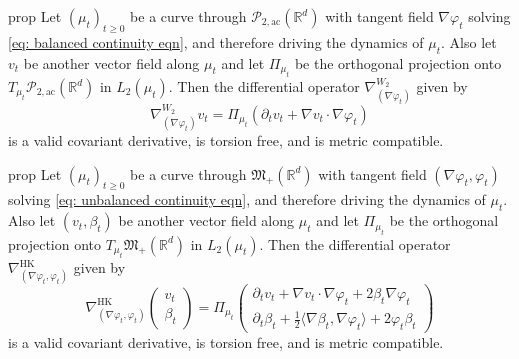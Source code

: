 \documentclass{article}
\newcommand{\pac}{\mathcal{P}_{2, \text{ac}}(\mathbb{R}^d)}
\newcommand{\posm}{\mathfrak{M}_+(\mathbb{R}^d)}
\begin{document}
\begin{restatable}{prop}{} \label{Wasserstein covariant deriv}
    Let $(\mu_t)_{t\geq 0}$ be a curve through $\pac$ with tangent field $\nabla \varphi_t$ solving \cref{eq: balanced continuity eqn}, and therefore driving the dynamics of $\mu_t$. Also let $v_t$ be another vector field along $\mu_t$ and let $\Pi_{\mu_t}$ be the orthogonal projection onto $T_{\mu_t}\pac$ in $L_2(\mu_t)$. Then the differential operator $\nabla_{(\nabla\varphi_t)}^{W_2}$ given by
    \begin{equation*}
        \nabla_{(\nabla\varphi_t)}^{W_2}v_t = \Pi_{\mu_t}\left(\partial_t v_t + \nabla v_t \cdot \nabla \varphi_t\right)
    \end{equation*}
    is a valid covariant derivative, is torsion free, and is metric compatible. 
\end{restatable}

\begin{restatable}{prop}{} \label{HK covariant deriv}
    Let $(\mu_t)_{t\geq 0}$ be a curve through $\posm$ with tangent field $(\nabla \varphi_t, \varphi_t)$ solving \cref{eq: unbalanced continuity eqn}, and therefore driving the dynamics of $\mu_t$. Also let $(v_t, \beta_t)$ be another vector field along $\mu_t$ and let $\Pi_{\mu_t}$ be the orthogonal projection onto $T_{\mu_t}\posm$ in $L_2(\mu_t)$. Then the differential operator $\nabla_{(\nabla\varphi_t, \varphi_t)}^{\text{HK}}$ given by
    \begin{equation*}
        \nabla_{(\nabla\varphi_t, \varphi_t)}^{\text{HK}} \begin{pmatrix}
            v_t \\
            \beta_t
        \end{pmatrix} = \Pi_{\mu_t}\begin{pmatrix}
            \partial_t v_t + \nabla v_t \cdot \nabla \varphi_t + 2\beta_t\nabla\varphi_t \\
            \partial_t \beta_t + \frac{1}{2}\langle \nabla \beta_t, \nabla \varphi_t\rangle + 2\varphi_t\beta_t
        \end{pmatrix}
    \end{equation*}
    is a valid covariant derivative, is torsion free, and is metric compatible. 
\end{restatable}
\end{document}
